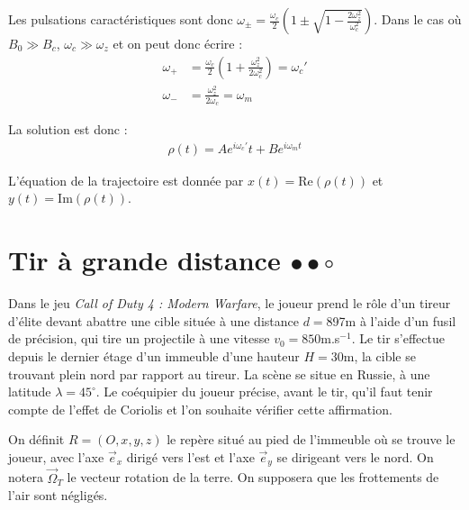 \documentclass{report}
\begin{document}
\begin{itemize}
		Les pulsations caractéristiques sont donc $\omega_\pm=\frac{\omega_c}{2}\left( 1 \pm\sqrt{1- \frac{2\omega_z^2}{\omega_c^2}}\right)$. Dans le cas où $B_0\gg B_c$, $\omega_c\gg\omega_z$ et on peut donc écrire :
		\begin{align*}
			\omega_+&=\frac{\omega_c}{2}\left( 1 +\frac{\omega_z^2}{2\omega_c^2}\right)= \omega_c'\\
			\omega_-&=\frac{\omega_z^2}{2\omega_c}=\omega_m
		\end{align*}
		
		La solution est donc :
		\begin{align*}
			\rho(t)=Ae^{i\omega_c'}t+Be^{i\omega_mt}
		\end{align*}
		
		L'équation de la trajectoire est donnée par $x(t)=\mathrm{Re}(\rho(t))$ et $y(t)=\mathrm{Im}(\rho(t))$.
		
\end{itemize}

\newpage

\section*{Tir à grande distance $\bullet\bullet\circ$}

Dans le jeu \textit{Call of Duty 4 : Modern Warfare}, le joueur prend le rôle d'un tireur d'élite devant abattre une cible située à une distance $d=$897m à l'aide d'un fusil de précision, qui tire un projectile à une vitesse $v_0=850$m.s$^{-1}$. Le tir s'effectue depuis le dernier étage d'un immeuble d'une hauteur $H=30$m, la cible se trouvant plein nord par rapport au tireur. La scène se situe en Russie, à une latitude $\lambda=45^\circ$. Le coéquipier du joueur précise, avant le tir, qu'il faut tenir compte de l'effet de Coriolis et l'on souhaite vérifier cette affirmation.

On définit $R=(O,x,y,z)$ le repère situé au pied de l'immeuble où se trouve le joueur, avec l'axe $\vec{e}_x$ dirigé vers l'est et l'axe $\vec{e}_y$ se dirigeant vers le nord. On notera $\vec{\Omega}_T$ le vecteur rotation de la terre. On supposera que les frottements de l'air sont négligés.
\end{document}
